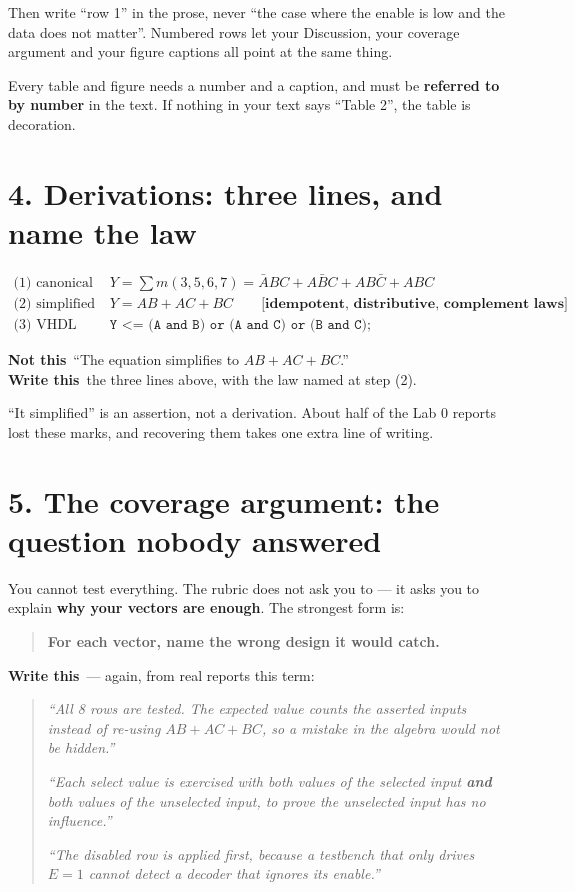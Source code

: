\documentclass[11pt]{article}
\newcommand{\code}[1]{\texttt{#1}}
\newcommand{\yes}{\textcolor{good}{\textbf{Write this}}}
\newcommand{\no}{\textcolor{bad}{\textbf{Not this}}}
\begin{document}
Then write ``row 1'' in the prose, never ``the case where the enable is low and the
data does not matter''. Numbered rows let your Discussion, your coverage argument
and your figure captions all point at the same thing.

Every table and figure needs a number and a caption, and must be \textbf{referred to
by number} in the text. If nothing in your text says ``Table 2'', the table is
decoration.

\section*{4. Derivations: three lines, and name the law}

\begin{align*}
\text{(1) canonical} \quad & Y = \textstyle\sum m(3,5,6,7) = \bar{A}BC + A\bar{B}C + AB\bar{C} + ABC \\
\text{(2) simplified} \quad & Y = AB + AC + BC
   \qquad \textbf{[idempotent, distributive, complement laws]} \\
\text{(3) VHDL} \quad & \code{Y <= (A and B) or (A and C) or (B and C);}
\end{align*}

\no\ ``The equation simplifies to $AB + AC + BC$.''\\
\yes\ the three lines above, with the law named at step (2).

``It simplified'' is an assertion, not a derivation. About half of the Lab 0 reports
lost these marks, and recovering them takes one extra line of writing.

\section*{5. The coverage argument: the question nobody answered}

You cannot test everything. The rubric does not ask you to --- it asks you to
explain \textbf{why your vectors are enough}. The strongest form is:

\begin{quote}
\textbf{For each vector, name the wrong design it would catch.}
\end{quote}

\yes\ --- again, from real reports this term:
\begin{quote}
\emph{``All 8 rows are tested. The expected value counts the asserted inputs
instead of re-using $AB+AC+BC$, so a mistake in the algebra would not be hidden.''}

\emph{``Each select value is exercised with both values of the selected input
\textbf{and} both values of the unselected input, to prove the unselected input has
no influence.''}

\emph{``The disabled row is applied first, because a testbench that only drives
$E = 1$ cannot detect a decoder that ignores its enable.''}
\end{quote}
\end{document}
